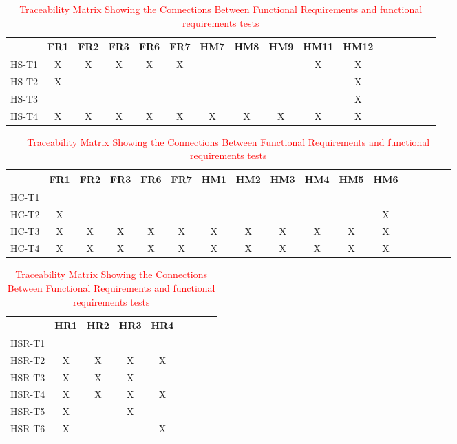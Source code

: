 \documentclass[12pt, titlepage]{article}
\begin{document}
\begin{landscape}
\begin{table}[h!]
\centering
\begin{tabular}{|c|c|c|c|c|c|c|c|c|c|c|c|c|c|c|c|c|}
\hline
	& FR1 & FR2 & FR3 & FR6 & FR7 & HM7 & HM8 & HM9 & HM11 & HM12 \\
\hline
HS-T1        & X& X& X& X& X& & & & X& X  \\ \hline
HS-T2        & X& & & & & & & & & X  \\ \hline
HS-T3        & & & & & & & & & & X  \\ \hline
HS-T4        & X& X& X& X& X& X& X& X& X& X  \\ \hline

\end{tabular}
\caption{\textcolor{red}{Traceability Matrix Showing the Connections Between Functional Requirements and functional requirements tests}}
\label{Table:A_trace}
\end{table}

\begin{table}[h!]
\centering
\begin{tabular}{|c|c|c|c|c|c|c|c|c|c|c|c|c|c|c|c|c|}
\hline
	& FR1 & FR2 & FR3 & FR6 & FR7 & HM1 & HM2 & HM3 & HM4 & HM5 & HM6  \\
\hline
HC-T1        & & & & & & & & & & &  \\ \hline
HC-T2        & X& & & & & & & & & &  X\\ \hline
HC-T3        & X& X& X& X& X& X& X& X& X& X& X \\ \hline
HC-T4        & X& X& X& X& X& X& X& X& X& X& X \\ \hline

\end{tabular}
\caption{\textcolor{red}{Traceability Matrix Showing the Connections Between Functional Requirements and functional requirements tests}}
\label{Table:A_trace}
\end{table}


\begin{table}[h!]
\centering
\begin{tabular}{|c|c|c|c|c|c|c|c|c|}
\hline
& HR1 & HR2 & HR3 & HR4  \\
\hline
HSR-T1        & & & & \\ \hline
HSR-T2        & X& X& X& X \\ \hline
HSR-T3        & X& X& X& \\ \hline
HSR-T4        & X& X& X& X \\ \hline
HSR-T5        & X& & X& \\ \hline
HSR-T6        & X& & & X\\ \hline
\end{tabular}
\caption{\textcolor{red}{Traceability Matrix Showing the Connections Between Functional Requirements and functional requirements tests}}
\label{Table:A_trace}
\end{table}
\end{landscape}
\end{document}
